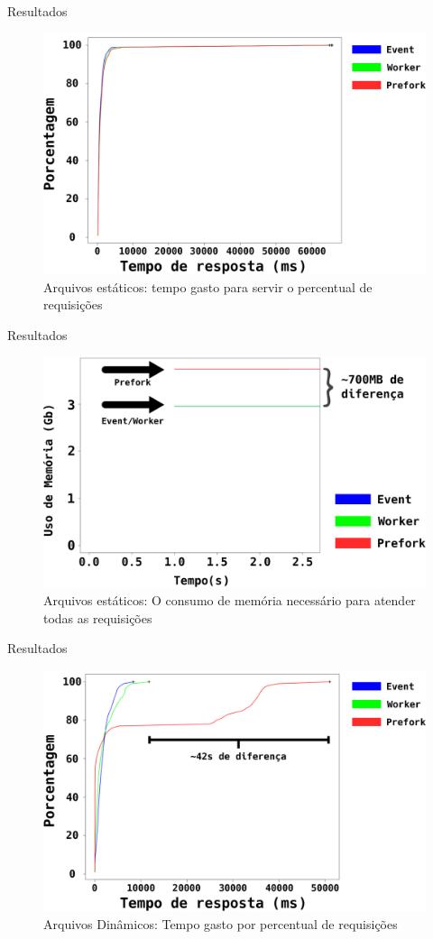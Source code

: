\documentclass[xcolor={usenames,svgnames,dvipsnames},brazil,english,12pt,aspectratio=149]{beamer}
\begin{document}
\begin{frame}{Resultados}
	\begin{figure}[!h]
		\centering
		\includegraphics[width=.60\textwidth]{static_file}
		\caption{Arquivos estáticos: tempo gasto para servir o percentual de requisições}
		\label{fig:static_file}
	\end{figure}
\end{frame}

\begin{frame}{Resultados}
	\begin{figure}[!h]
		\centering
		\includegraphics[width=.70\textwidth]{static_file_memory_usage}
		\caption{Arquivos estáticos: O consumo de memória necessário para atender todas as requisições}
		\label{fig:static_file_memory}
	\end{figure}
\end{frame}

\begin{frame}{Resultados}
	\begin{figure}[!h]
		\centering
		\includegraphics[width=.60\textwidth]{dynamic_file_request_time}

		\caption{Arquivos Dinâmicos: Tempo gasto por percentual de requisições}
		\label{fig:dynamic_file}
	\end{figure}
\end{frame}
\end{document}
